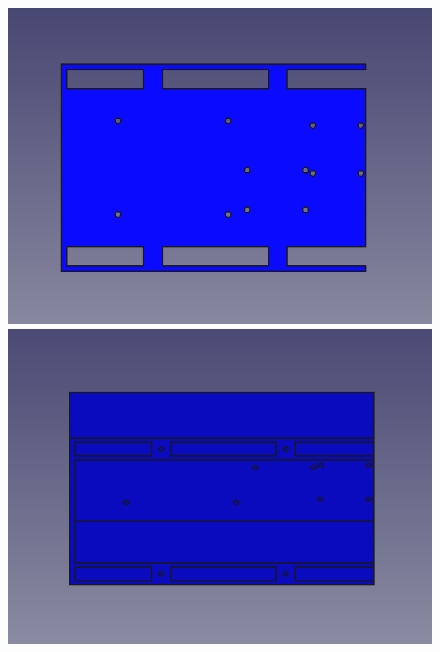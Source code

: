 \begin{figure}[ht!]
	\centering
	\begin{minipage}{0.45\linewidth}
		\centering
		\includegraphics[width=\linewidth]{figs/cap5/superior1.png}
		\caption*{\centering} %
	\end{minipage}
	\hspace{1cm}
	\begin{minipage}{0.45\linewidth}
		\centering
		\includegraphics[width=\linewidth]{figs/cap5/superior2.png}
		\caption*{\centering} %
	\end{minipage}
	\hspace{1cm}
	\begin{minipage}{0.45\linewidth}
		\centering

\end{minipage}
\end{figure}
